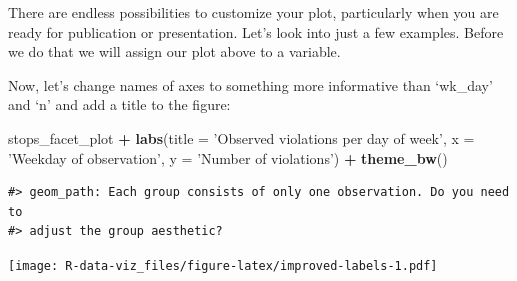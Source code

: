 \documentclass[]{book}
\newenvironment{Shaded}{\begin{snugshade}}{\end{snugshade}}
\newcommand{\KeywordTok}[1]{\textcolor[rgb]{0.13,0.29,0.53}{\textbf{#1}}}
\newcommand{\DataTypeTok}[1]{\textcolor[rgb]{0.13,0.29,0.53}{#1}}
\newcommand{\StringTok}[1]{\textcolor[rgb]{0.31,0.60,0.02}{#1}}
\newcommand{\OtherTok}[1]{\textcolor[rgb]{0.56,0.35,0.01}{#1}}
\newcommand{\OperatorTok}[1]{\textcolor[rgb]{0.81,0.36,0.00}{\textbf{#1}}}
\newcommand{\NormalTok}[1]{#1}
\theoremstyle{definition}
\theoremstyle{definition}
\theoremstyle{definition}
\theoremstyle{remark}
\begin{document}
There are endless possibilities to customize your plot, particularly
when you are ready for publication or presentation. Let's look into just
a few examples. Before we do that we will assign our plot above to a
variable.

\begin{Shaded}
\end{Shaded}

Now, let's change names of axes to something more informative than
`wk\_day' and `n' and add a title to the figure:

\begin{Shaded}
\begin{Highlighting}[]
\NormalTok{stops_facet_plot }\OperatorTok{+}
\StringTok{  }\KeywordTok{labs}\NormalTok{(}\DataTypeTok{title =} \StringTok{'Observed violations per day of week'}\NormalTok{,}
         \DataTypeTok{x =} \StringTok{'Weekday of observation'}\NormalTok{,}
         \DataTypeTok{y =} \StringTok{'Number of violations'}\NormalTok{) }\OperatorTok{+}
\StringTok{  }\KeywordTok{theme_bw}\NormalTok{()}
\end{Highlighting}
\end{Shaded}

\begin{verbatim}
#> geom_path: Each group consists of only one observation. Do you need to
#> adjust the group aesthetic?
\end{verbatim}

\texttt{[image: R-data-viz\_files/figure-latex/improved-labels-1.pdf]}
\end{document}
